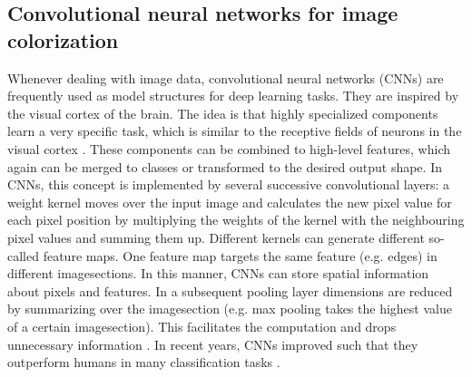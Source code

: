 \documentclass[12pt,letterpaper]{article}
\begin{document}
\subsection{Convolutional neural networks for image colorization}
Whenever dealing with image data, convolutional neural networks (CNNs) are frequently used as model structures for deep learning tasks. They are inspired by the visual cortex of the brain. The idea is that highly specialized components learn a very specific task, which is similar to the receptive fields of neurons in the visual cortex \citep{Hubel1962}. These components can be combined to high-level features, which again can be merged to classes or transformed to the desired output shape. In CNNs, this concept is implemented by several successive convolutional layers: a weight kernel moves over the input image and calculates the new pixel value for each pixel position by multiplying the weights of the kernel with the neighbouring pixel values and summing them up. Different kernels can generate different so-called feature maps. One feature map targets the same feature (e.g. edges) in different imagesections. In this manner, CNNs can store spatial information about pixels and features. In a subsequent pooling layer dimensions are reduced by summarizing over the imagesection (e.g. max pooling takes the highest value of a certain imagesection). This facilitates the computation and drops unnecessary information \citep{Lecture.2019}. In recent years, CNNs improved such that they outperform humans in many classification tasks \citep{Russakovsky.2014}.
\end{document}
